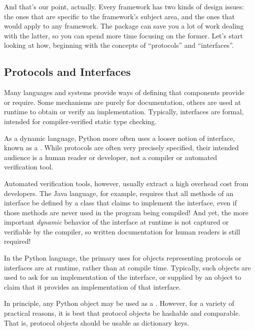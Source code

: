\begin{verbatim%
}
\begin{verbatim%
}
And that's our point, actually.  Every framework has two kinds of design
issues: the ones that are specific to the framework's subject area, and the
ones that would apply to any framework.  The  package can
save you a lot of work dealing with the latter, so you can spend more time
focusing on the former.  Let's start looking at how, beginning with the
concepts of ``protocols'' and ``interfaces''.












\subsection{Protocols and Interfaces \label{protocol-concepts}}

Many languages and systems provide ways of defining  that
components provide or require.  Some mechanisms are purely for documentation,
others are used at runtime to obtain or verify an implementation.  Typically,
interfaces are formal, intended for compiler-verified static type checking.

As a dynamic language, Python more often uses a looser notion of interface,
known as a .  While protocols are often very precisely
specified, their intended audience is a human reader or developer, not a
compiler or automated verification tool.

Automated verification tools, however, usually extract a high overhead cost
from developers.  The Java language, for example, requires that all methods
of an interface be defined by a class that claims to implement the
interface, even if those methods are never used in the program being
compiled!  And yet, the more important \emph{dynamic} behavior of the
interface at runtime is not captured or verifiable by the compiler, so written
documentation for human readers is still required!

In the Python language, the primary uses for objects representing protocols
or interfaces are at runtime, rather than at compile time.  Typically, such
objects are used to ask for an implementation of the interface, or supplied
by an object to claim that it provides an implementation of that interface.

In principle, any Python object may be used as a .
However, for a variety of practical reasons, it is best that protocol objects
be hashable and comparable.  That is, protocol objects should be usable as
dictionary keys.


\end{verbatim%
}
\end{verbatim%
}
